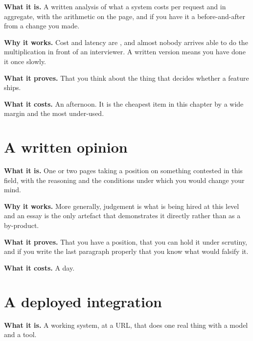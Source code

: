 \textbf{What it is.} A written analysis of what a system costs per request and
in aggregate, with the arithmetic on the page, and \dash{} if you have it
\dash{} a before-and-after from a change you made.

\textbf{Why it works.} Cost and latency are , and almost nobody arrives able to do the
multiplication in front of an interviewer. A written version means you have
done it once slowly.

\textbf{What it proves.} That you think about the thing that decides whether a
feature ships. 

\textbf{What it costs.} An afternoon. It is the cheapest item in this chapter by
a wide margin and the most under-used.

\section{A written opinion}

\textbf{What it is.} One or two pages taking a position on something contested
in this field, with the reasoning and the conditions under which you would
change your mind.

\textbf{Why it works.}  More generally, judgement is what is
being hired at this level and an essay is the only artefact that demonstrates it
directly rather than as a by-product.

\textbf{What it proves.} That you have a position, that you can hold it under
scrutiny, and \dash{} if you write the last paragraph properly \dash{} that you
know what would falsify it.

\textbf{What it costs.} A day. 

\section{A deployed integration}

\textbf{What it is.} A working system, at a URL, that does one real thing with
a model and a tool.


